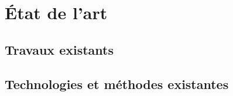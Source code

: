 \chapter{État de l'art}


\section{Travaux existants}


\section{Technologies et méthodes existantes}



